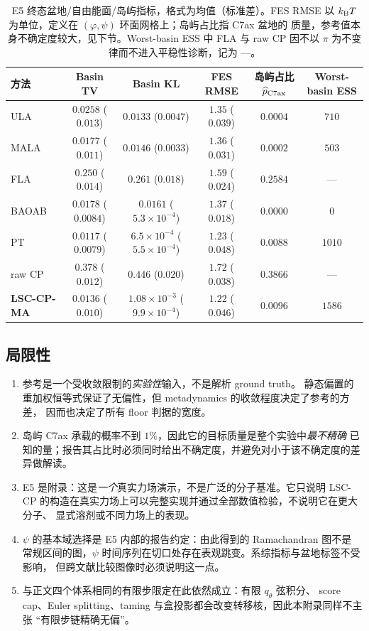 \documentclass[11pt,a4paper]{article}
\renewcommand{\textsc}[1]{\textsf{\MakeUppercase{#1}}}
\begin{document}
\begin{table}[H]
\centering
\footnotesize
\setlength{\tabcolsep}{4.2pt}
\begin{tabular}{lccccc}
\toprule
方法 & Basin TV & Basin KL & FES RMSE & 岛屿占比 $\widehat p_{\rm C7ax}$ & Worst-basin ESS \\
\midrule
\textsc{ula} & $0.0258$ ($0.013$) & $0.0133$ ($0.0047$) & $1.35$ ($0.039$) & $0.0004$ & $710$\\
\textsc{mala} & $0.0177$ ($0.011$) & $0.0146$ ($0.0033$) & $1.36$ ($0.031$) & $0.0002$ & $503$\\
\textsc{fla} & $0.250$ ($0.014$) & $0.261$ ($0.018$) & $1.59$ ($0.024$) & $0.2584$ & ---\\
\textsc{baoab} & $0.0178$ ($0.0084$) & $0.0161$ ($5.3\times10^{-4}$) & $1.37$ ($0.018$) & $0.0000$ & $0$\\
\textsc{pt} & $0.0117$ ($0.0079$) & $6.5\times10^{-4}$ ($5.5\times10^{-4}$) & $1.23$ ($0.048$) & $0.0088$ & $1010$\\
raw \textsc{cp} & $0.378$ ($0.012$) & $0.446$ ($0.020$) & $1.72$ ($0.038$) & $0.3866$ & ---\\
\textbf{\textsc{lsc-cp-ma}} & $0.0136$ ($0.010$) & $1.08\times10^{-3}$ ($9.9\times10^{-4}$) & $1.22$ ($0.046$) & $0.0096$ & $1586$\\
\bottomrule
\end{tabular}
\caption{E5 终态盆地/自由能面/岛屿指标，格式为均值（标准差）。FES RMSE 以
$k_{\rm B}T$ 为单位，定义在 $(\varphi,\psi)$ 环面网格上；岛屿占比指 C7ax 盆地的
质量，参考值本身不确定度较大，见下节。Worst-basin ESS 中 \textsc{fla} 与 raw
\textsc{cp} 因不以 $\pi$ 为不变律而不进入平稳性诊断，记为 ---。}
\end{table}

\subsection{局限性}

\begin{enumerate}
 \item 参考是一个受收敛限制的\emph{实验性}输入，不是解析 ground truth。
 静态偏置的重加权恒等式保证了无偏性，但 metadynamics 的收敛程度决定了参考的方差，
 因而也决定了所有 floor 判据的宽度。
 \item 岛屿 C7ax 承载的概率不到 $1\%$，因此它的目标质量是整个实验中\emph{最不精确}
 已知的量；报告其占比时必须同时给出不确定度，并避免对小于该不确定度的差异做解读。
 \item E5 是附录：这是\emph{一个}真实力场演示，不是广泛的分子基准。它只说明
 LSC-CP 的构造在真实力场上可以完整实现并通过全部数值检验，不说明它在更大分子、
 显式溶剂或不同力场上的表现。
 \item $\psi$ 的基本域选择是 E5 内部的报告约定：由此得到的 Ramachandran 图不是
 常规区间的图，$\psi$ 时间序列在切口处存在表观跳变。系综指标与盆地标签不受影响，
 但跨文献比较图像时必须说明这一点。
 \item 与正文四个体系相同的有限步限定在此依然成立：有限 $q_\theta$ 弦积分、
 score cap、Euler splitting、taming 与盒投影都会改变转移核，因此本附录同样不主张
 “有限步链精确无偏”。
\end{enumerate}
\end{document}
